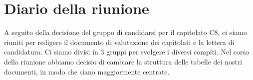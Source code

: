 \section{Diario della riunione}

A seguito della decisione del gruppo di candidarsi per il capitolato C8, ci siamo riuniti per redigere il documento di valutazione dei capitolati e la lettera di candidatura. Ci siamo divisi in 3 gruppi per svolgere i diversi compiti.\newline
Nel corso della riunione abbiamo decisio di cambiare la struttura delle tabelle dei nostri documenti, in modo che siano maggiormente centrate.